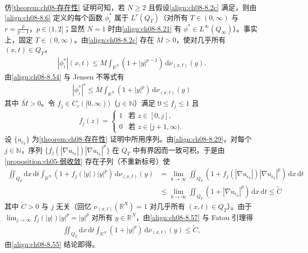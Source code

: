 \documentclass[../../main.tex]{subfiles}%
\begin{document}
\begin{remark}\label{remark:ch08-phi星可积}
仿\cref{theorem:ch08-存在性} 证明可知，若 $N\geqslant2$ 且假设\eqref{align:ch08-8.2c} 满足，则由\eqref{align:ch08-8.6} 定义的每个函数 $\phi_i^*$ 属于 $L^r(Q_T)$（对所有 $T\in(0,\infty)$ 与 $r=\frac{p}{p-1}$，$p\in(1,2]$；显然 $N=1$ 时由\eqref{align:ch08-8.21} 有 $\phi^*\in L^\infty(Q_\infty)$）。事实上，固定 $T\in(0,\infty)$。由\eqref{align:ch08-8.2c} 存在 $M>0$，使对几乎所有 $(x,t)\in Q_T$，
\begin{align}
|\phi_i^*|(x,t)\leqslant M\int_{\mathbb{R}^N}(1+|y|^{p-1})\,\mathrm{d}\nu_{(x,t)}(y). \label{align:ch08-8.54}
\end{align}
由\eqref{align:ch08-8.54} 与 Jensen 不等式有
\begin{align}
|\phi_i^*|^r\leqslant\bar M\int_{\mathbb{R}^N}(1+|y|^p)\,\mathrm{d}\nu_{(x,t)}(y) \label{align:ch08-8.55}
\end{align}
其中 $\bar M>0$。令 $f_j\in C_c([0,\infty))$（$j\in\mathbb{N}$）满足 $0\leqslant f_j\leqslant1$ 且
\begin{align}
f_j(z)=
\begin{cases}
1 & \text{若 }z\in[0,j],\\
0 & \text{若 }z\in[j+1,\infty).
\end{cases} \label{align:ch08-8.56}
\end{align}
设 $\{u_{\epsilon_k}\}$ 为\cref{theorem:ch08-存在性} 证明中所用序列。由\eqref{align:ch08-8.29}，对每个 $j\in\mathbb{N}$，序列 $\{f_j(|\nabla u_{\epsilon_k}|)|\nabla u_{\epsilon_k}|^p\}$ 在 $Q_T$ 中有界因而一致可积。于是由\cref{proposition:ch05-弱收敛} 存在子列（不重新标号）使
\begin{align}
\iint_{Q_T}\mathrm{d}x\,\mathrm{d}t\int_{\mathbb{R}^N}(1+f_j(|y|)|y|^p)\,\mathrm{d}\nu_{(x,t)}(y)
&=\lim_{k\to\infty}\iint_{Q_T}(1+f_j(|\nabla u_{\epsilon_k}|)|\nabla u_{\epsilon_k}|^p)\,\mathrm{d}x\,\mathrm{d}t\nonumber\\
&\leqslant\lim_{k\to\infty}\iint_{Q_T}(1+|\nabla u_{\epsilon_k}|^p)\,\mathrm{d}x\,\mathrm{d}t\leqslant\widetilde C \label{align:ch08-8.57}
\end{align}
其中 $\widetilde C>0$ 与 $j$ 无关（回忆 $\nu_{(x,t)}(\mathbb{R}^N)=1$ 对几乎所有 $(x,t)\in Q_T$）。由于 $\lim_{j\to\infty}f_j(|y|)|y|^p=|y|^p$ 对所有 $y\in\mathbb{R}^N$，由\eqref{align:ch08-8.57} 与 Fatou 引理得
\begin{align*}
\iint_{Q_T}\mathrm{d}x\,\mathrm{d}t\int_{\mathbb{R}^N}(1+|y|^p)\,\mathrm{d}\nu_{(x,t)}(y)\leqslant\widetilde C,
\end{align*}
由\eqref{align:ch08-8.55} 结论即得。
\end{remark}
\end{document}
